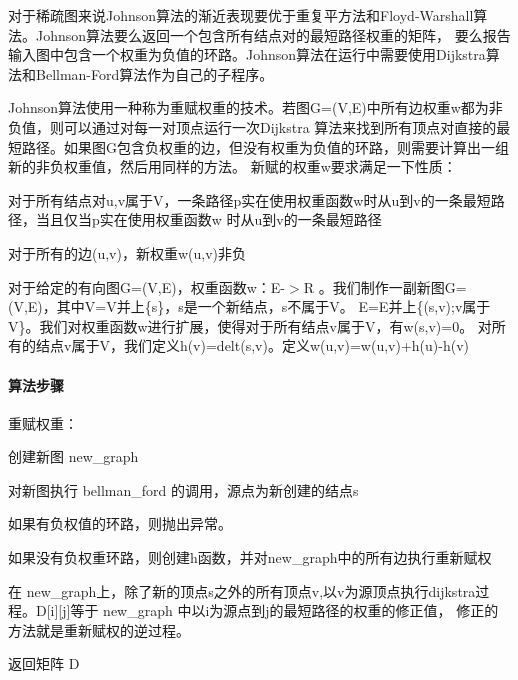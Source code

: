 对于稀疏图来说\+Johnson算法的渐近表现要优于重复平方法和\+Floyd-\/\+Warshall算法。\+Johnson算法要么返回一个包含所有结点对的最短路径权重的矩阵， 要么报告输入图中包含一个权重为负值的环路。\+Johnson算法在运行中需要使用\+Dijkstra算法和\+Bellman-\/\+Ford算法作为自己的子程序。

Johnson算法使用一种称为重赋权重的技术。若图\+G=(V,E)中所有边权重w都为非负值，则可以通过对每一对顶点运行一次\+Dijkstra 算法来找到所有顶点对直接的最短路径。如果图\+G包含负权重的边，但没有权重为负值的环路，则需要计算出一组新的非负权重值，然后用同样的方法。 新赋的权重w\textquotesingle{}要求满足一下性质：


\begin{DoxyItemize}
\item 对于所有结点对u,v属于\+V，一条路径p实在使用权重函数w时从u到v的一条最短路径，当且仅当p实在使用权重函数w\textquotesingle{} 时从u到v的一条最短路径
\item 对于所有的边(u,v)，新权重w\textquotesingle{}(u,v)非负
\end{DoxyItemize}

对于给定的有向图\+G=(V,E)，权重函数w：\+E-\/$>$R 。我们制作一副新图\+G\textquotesingle{}=(V\textquotesingle{},E\textquotesingle{})，其中\+V\textquotesingle{}=V并上\{s\}，s是一个新结点，s不属于\+V。 E\textquotesingle{}=E并上\{(s,v);v属于\+V\}。我们对权重函数w进行扩展，使得对于所有结点v属于\+V，有w(s,v)=0。 对所有的结点v属于\+V\textquotesingle{}，我们定义h(v)=delt(s,v)。定义w\textquotesingle{}(u,v)=w(u,v)+h(u)-\/h(v)

\paragraph*{算法步骤}


\begin{DoxyItemize}
\item 重赋权重：
\begin{DoxyItemize}
\item 创建新图 new\+\_\+graph
\item 对新图执行 bellman\+\_\+ford 的调用，源点为新创建的结点s
\item 如果有负权值的环路，则抛出异常。
\item 如果没有负权重环路，则创建h函数，并对new\+\_\+graph中的所有边执行重新赋权
\end{DoxyItemize}
\item 在 new\+\_\+graph上，除了新的顶点s之外的所有顶点v,以v为源顶点执行dijkstra过程。\+D\mbox{[}i\mbox{]}\mbox{[}j\mbox{]}等于 new\+\_\+graph 中以i为源点到j的最短路径的权重的修正值， 修正的方法就是重新赋权的逆过程。
\item 返回矩阵 D
\end{DoxyItemize}

